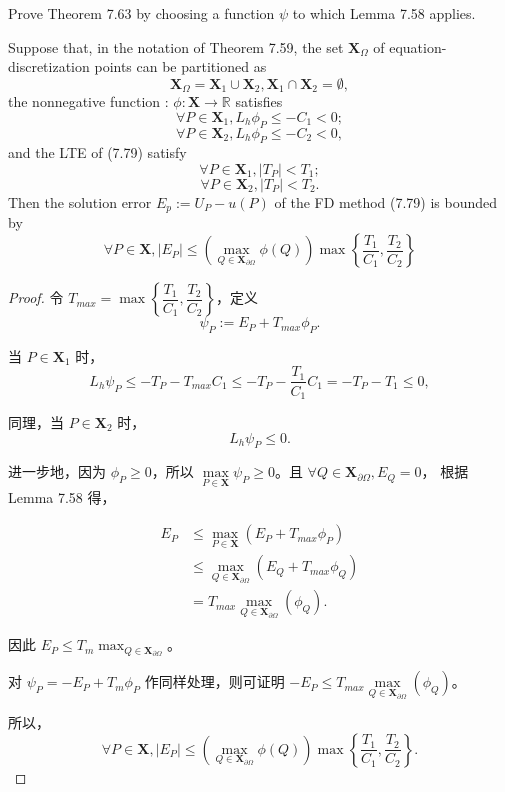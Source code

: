 \documentclass[lang=cn,a4paper,newtx,bibend=bibtex]{elegantpaper}
\newcommand{\XB}{\bm{X}}
\newcommand{\RBB}{\mathbb{R}}
\begin{document}
\begin{prob}[Exercise 7.64]
  Prove Theorem 7.63 by choosing a function $\psi$ to which Lemma 7.58 applies.
  \begin{prob}
    Suppose that, in the notation of Theorem 7.59, the set
    $\XB_{\Omega}$ of equation-discretization points can be partitioned
    as 
    \[\XB_{\Omega} = \XB_1 \cup \XB_2, \XB_1 \cap \XB_2 = \emptyset,\]
    the nonnegative function : $\phi : \XB\to \RBB$ satisfies
    \[\forall P \in \XB_1, L_h\phi_P \le -C_1 < 0;\]
    \[\forall P \in \XB_2, L_h\phi_P \le -C_2 < 0,\]
    and the LTE of (7.79) satisfy
    \[\forall P \in \XB_1, |T_P| < T_1;\]
    \[\forall P \in \XB_2, |T_P| < T_2.\]
    Then the solution error $E_p := U_P - u(P)$ of the FD method (7.79)
    is bounded by
    \[\forall P \in \XB, |E_P| \le \left(\max_{Q\in \XB_{\partial \Omega} } \phi(Q)\right) \max\left\{\dfrac{T_1}{C_1}, \dfrac{T_2}{C_2}\right\}\]
  \end{prob}
\end{prob}

\begin{proof}
令 $T_{max} = \max\left\{\dfrac{T_1}{C_1}, \dfrac{T_2}{C_2}\right\}$，定义
\[\psi_P := E_P + T_{max} \phi_P.\]

当 $P \in \XB_1$ 时，
\[L_h \psi_P \le - T_P - T_{max} C_1 \le -T_P  - \dfrac{T_1}{C_1}C_1 = -T_P - T_1 \le 0,\]
 
同理，当 $P \in \XB_2$ 时，
\[L_h \psi_P \le 0.\]

进一步地，因为 $\phi_P \ge 0$，所以 $\max\limits_{P\in \XB} \psi_P \ge 0$。且 $\forall Q \in \XB_{\partial \Omega}, E_Q =0 $，
根据 Lemma 7.58 得，

\begin{equation*}
\begin{aligned}
  E_P &\le \max_{P\in\XB} (E_P + T_{max} \phi_P) \\
      &\le \max_{Q\in \XB_{\partial \Omega}} (E_Q + T_{max} \phi_Q) \\
      &= T_{max} \max_{Q\in \XB_{\partial \Omega}} (\phi_Q).
\end{aligned}
\end{equation*}

因此 $E_P \le T_m \max_{Q\in \XB_{\partial \Omega}}。$

对 $\psi_P = -E_P + T_m \phi_P$ 作同样处理，则可证明 $-E_P \le T_{max} \max\limits_{Q\in \XB_{\partial \Omega}} (\phi_Q)$。

所以，
\[\forall P \in \XB, |E_P| \le \left(\max_{Q\in \XB_{\partial \Omega} } \phi(Q)\right) \max\left\{\dfrac{T_1}{C_1}, \dfrac{T_2}{C_2}\right\}.\]
\end{proof}

\nocite{*}
\printbibliography[heading=bibintoc, title=\ebibname]
\end{document}

